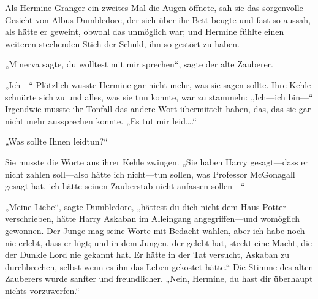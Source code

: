 Als Hermine Granger ein zweites Mal die Augen öffnete, sah sie das sorgenvolle Gesicht von Albus Dumbledore, der sich über ihr Bett beugte und fast so aussah, als hätte er geweint, obwohl das unmöglich war; und Hermine fühlte einen weiteren stechenden Stich der Schuld, ihn so gestört zu haben.

„Minerva sagte, du wolltest mit mir sprechen“, sagte der alte Zauberer.


„Ich—“ Plötzlich wusste Hermine gar nicht mehr, was sie sagen sollte. Ihre Kehle schnürte sich zu und alles, was sie tun konnte, war zu stammeln: „Ich—ich bin—“ Irgendwie musste ihr Tonfall das andere Wort übermittelt haben, das, das sie gar nicht mehr aussprechen konnte. „Es tut mir leid….“

„Was sollte Ihnen leidtun?“

Sie musste die Worte aus ihrer Kehle zwingen.
„Sie haben Harry gesagt—dass er nicht zahlen soll—also hätte ich nicht—tun sollen, was Professor McGonagall gesagt hat, ich hätte seinen Zauberstab nicht anfassen sollen—“

„Meine Liebe“, sagte Dumbledore, „hättest du dich nicht dem Haus Potter verschrieben, hätte Harry Askaban im Alleingang angegriffen—und womöglich gewonnen. Der Junge mag seine Worte mit Bedacht wählen, aber ich habe noch nie erlebt, dass er lügt; und in dem Jungen, der gelebt hat, steckt eine Macht, die der Dunkle Lord nie gekannt hat. Er hätte in der Tat versucht, Askaban zu durchbrechen, selbst wenn es ihn das Leben gekostet hätte.“
Die Stimme des alten Zauberers wurde sanfter und freundlicher.
„Nein, Hermine, du hast dir überhaupt nichts vorzuwerfen.“

